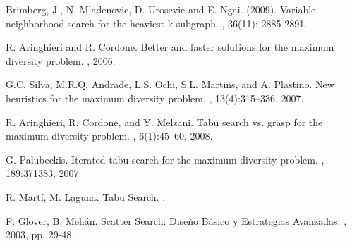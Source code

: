 \documentclass{ci5652}
\begin{document}
\begin{thebibliography}{99}

Brimberg, J., N. Mladenovic, D. Urosevic and E. Ngai. (2009).
\newblock Variable neighborhood search for the heaviest k-subgraph.
, 36(11): 2885-2891.

R. Aringhieri and R. Cordone.
\newblock Better and faster solutions for the maximum diversity problem.
, 2006.

G.C. Silva, M.R.Q. Andrade, L.S. Ochi, S.L. Martins, and A. Plastino.
\newblock New heuristics for the maximum diversity problem.
, 13(4):315–336, 2007.

R. Aringhieri, R. Cordone, and Y. Melzani.
\newblock Tabu search vs. grasp for the maximum diversity problem.
, 6(1):45–60, 2008.

G. Palubeckis.
\newblock Iterated tabu search for the maximum diversity problem.
, 189:371383, 2007.

R. Martí, M. Laguna.
\newblock Tabu Search.
.

F. Glover, B. Melián.
\newblock Scatter Search: Diseño Básico y Estrategias Avanzadas.
, 2003, pp. 29-48.


\end{thebibliography}
\end{document}
